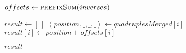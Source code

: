 \begin{frame}[containsverbatim]{\cwwSortMergePosfunctionframe}
\begin{algorithm}[H]
\begin{multicols}{2}
\begin{algorithmic}[1]
                                    \State $offsets \gets \Call{prefixSum}{inverses}$
    
                                    \State $result \gets \left[\ \right]$
                                        \State $\left<position, \_, \_, \_\right> \gets quadruplesMerged{\left[i\right]}$
                                        \State $result{\left[i\right]} \gets position + offsets{\left[i\right]}$
                                    \EndFor                               
        
                                    \State \Return $result$
                                \EndFunction
                            \end{algorithmic}
                        \end{multicols}
                    \end{algorithm}
                \endgroup
            \end{frame}

